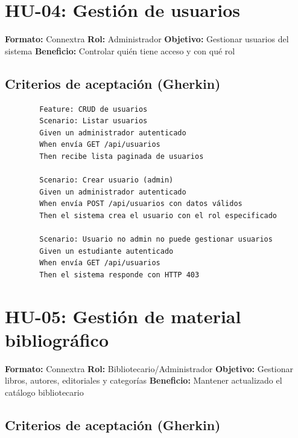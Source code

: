 \documentclass[
11pt,
a4paper,
]{report}
\begin{document}
	\hypertarget{hu-04-gestiuxf3n-de-usuarios}{%
		\section{HU-04: Gestión de usuarios}\label{hu-04-gestiuxf3n-de-usuarios}}
	
	\textbf{Formato:} Connextra
	\textbf{Rol:} Administrador
	\textbf{Objetivo:} Gestionar usuarios del sistema
	\textbf{Beneficio:} Controlar quién tiene acceso y con qué rol
	
	\hypertarget{criterios-de-aceptaciuxf3n-gherkin-3}{%
		\subsection{Criterios de aceptación (Gherkin)}\label{criterios-de-aceptaciuxf3n-gherkin-3}}
	
	\begin{lstlisting}
		Feature: CRUD de usuarios
		Scenario: Listar usuarios
		Given un administrador autenticado
		When envía GET /api/usuarios
		Then recibe lista paginada de usuarios
		
		Scenario: Crear usuario (admin)
		Given un administrador autenticado
		When envía POST /api/usuarios con datos válidos
		Then el sistema crea el usuario con el rol especificado
		
		Scenario: Usuario no admin no puede gestionar usuarios
		Given un estudiante autenticado
		When envía GET /api/usuarios
		Then el sistema responde con HTTP 403
	\end{lstlisting}
	
	\hypertarget{hu-05-gestiuxf3n-de-material-bibliogruxe1fico}{%
		\section{HU-05: Gestión de material bibliográfico}\label{hu-05-gestiuxf3n-de-material-bibliogruxe1fico}}
	
	\textbf{Formato:} Connextra
	\textbf{Rol:} Bibliotecario/Administrador
	\textbf{Objetivo:} Gestionar libros, autores, editoriales y categorías
	\textbf{Beneficio:} Mantener actualizado el catálogo bibliotecario
	
	\hypertarget{criterios-de-aceptaciuxf3n-gherkin-4}{%
		\subsection{Criterios de aceptación (Gherkin)}\label{criterios-de-aceptaciuxf3n-gherkin-4}}
	
\end{document}
